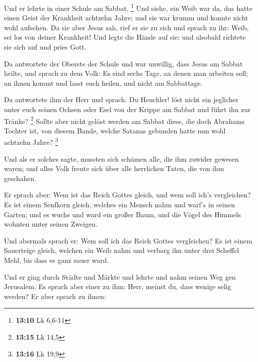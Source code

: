  Und er lehrte in einer Schule am Sabbat. \footnote{\textbf{13:10}
  Lk 6,6-11}  Und siehe, ein Weib war da, das hatte einen
Geist der Krankheit achtzehn Jahre; und sie war krumm und konnte nicht
wohl aufsehen.  Da sie aber Jesus sah, rief er sie zu sich
und sprach zu ihr: Weib, sei los von deiner Krankheit!  Und
legte die Hände auf sie; und alsobald richtete sie sich auf und pries
Gott.

 Da antwortete der Oberste der Schule und war unwillig,
dass Jesus am Sabbat heilte, und sprach zu dem Volk: Es sind sechs Tage,
an denen man arbeiten soll; an ihnen kommt und lasst euch heilen, und
nicht am Sabbattage.

 Da antwortete ihm der Herr und sprach: Du Heuchler! löst
nicht ein jeglicher unter euch seinen Ochsen oder Esel von der Krippe am
Sabbat und führt ihn zur Tränke? \footnote{\textbf{13:15} Lk 14,5}
 Sollte aber nicht gelöst werden am Sabbat diese, die doch
Abrahams Tochter ist, von diesem Bande, welche Satanas gebunden hatte
nun wohl achtzehn Jahre? \footnote{\textbf{13:16} Lk 19,9}

 Und als er solches sagte, mussten sich schämen alle, die
ihm zuwider gewesen waren; und alles Volk freute sich über alle
herrlichen Taten, die von ihm geschahen.

 Er sprach aber: Wem ist das Reich Gottes gleich, und wem
soll ich's vergleichen?  Es ist einem Senfkorn gleich,
welches ein Mensch nahm und warf's in seinen Garten; und es wuchs und
ward ein großer Baum, und die Vögel des Himmels wohnten unter seinen
Zweigen.

 Und abermals sprach er: Wem soll ich das Reich Gottes
vergleichen?  Es ist einem Sauerteige gleich, welchen ein
Weib nahm und verbarg ihn unter drei Scheffel Mehl, bis dass es ganz
sauer ward.

 Und er ging durch Städte und Märkte und lehrte und nahm
seinen Weg gen Jerusalem.  Es sprach aber einer zu ihm:
Herr, meinst du, dass wenige selig werden? Er aber sprach zu ihnen:

